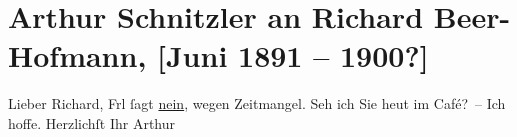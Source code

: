 

         
         \renewcommand{\erwaehntePersonen}{Personen: Richard Beer-Hofmann, Lillian Russell}
         \renewcommand{\erwaehnteWerke}{}
               \section[Arthur Schnitzler an Richard Beer-Hofmann, {[}Juni 1891 – 1900?{]}]{ Arthur Schnitzler an Richard Beer-Hofmann, {[}Juni 1891 – 1900?{]}}\nopagebreak{}\rehead{ }\begin{ledgroupsized}[t]{13cm}\normalsize\beginnumbering \toendnotes[C]{\smallbreak\pagebreak[2]} 
\toendnotes[C]{\smallbreak}\pstart
           \noindent{}{\pb}Lieber Richard, Frl \label{K_L00017-1v}\label{K_L00017-1h} ſagt \uline{nein}, wegen Zeitmangel.\pend
           \pstart
           Seh ich Sie heut im Café? – Ich hoffe. Herzlichſt\pend
           \pstart Ihr \spacefill\mbox{Arthur}\pend{}
         
         \endnumbering{}\end{ledgroupsized}  \newcommand{\dateiname}{L00017}\newcommand{\titel}{Arthur Schnitzler an Richard Beer-Hofmann, [Juni 1891 – 1900?]}\newcommand{\editorInnen}{Martin Anton Müller und Gerd-Hermann Susen}
      